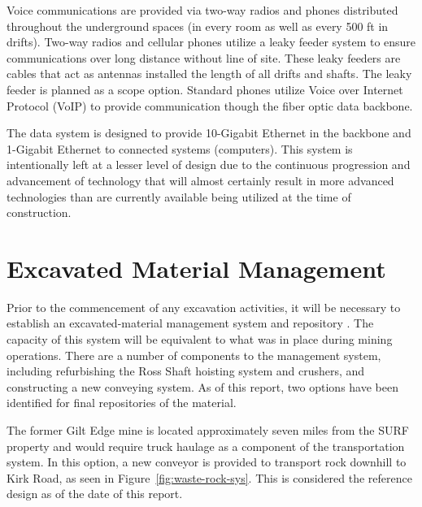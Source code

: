 Voice communications are provided via two-way radios and phones distributed throughout the underground spaces (in every room as well as every 500 ft in drifts). Two-way radios and cellular phones utilize a leaky feeder system to ensure communications over long distance without line of site. These leaky feeders are cables that act as antennas installed the length of all drifts and shafts. The leaky feeder is planned as a scope option.  Standard phones utilize Voice over Internet Protocol (VoIP) to provide communication though the fiber optic data backbone.

The data system is designed to provide 10-Gigabit Ethernet in the backbone and 1-Gigabit Ethernet to connected systems (computers). This system is intentionally left at a lesser level of design due to the continuous progression and advancement of technology that will almost certainly result in more advanced technologies than are currently available being utilized at the time of construction.

\section{Excavated Material Management}
\label{sec:fscf-und-waste-rock}

Prior to the commencement of any excavation activities, it will be necessary to establish an excavated-material management system and repository . The capacity of this system will be equivalent to what was in place during mining operations. 
There are a number of components to the management system, including refurbishing the Ross Shaft hoisting system and %
crushers, and constructing a new conveying system.  As of this report, two options have been identified for final repositories of the material.  

The former Gilt Edge mine is located approximately seven miles from the SURF property and would require truck haulage as a component of the transportation system.  In this option, a new conveyor is provided to transport rock downhill to Kirk Road, as seen in Figure~\ref{fig:waste-rock-sys}. This is considered the reference design as of the date of this report.

